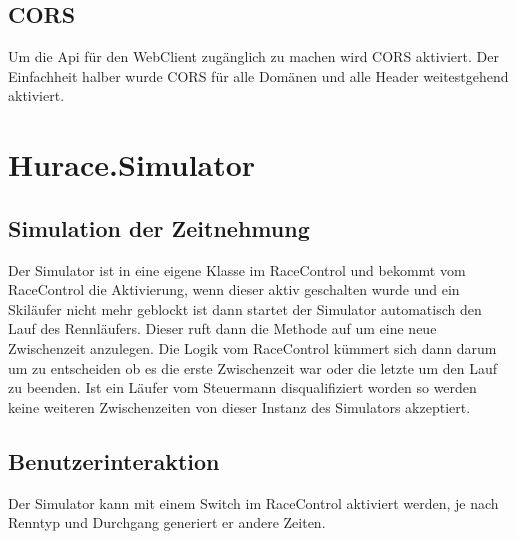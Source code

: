 \documentclass[a4paper, 12pt]{article}
\begin{document}
	\subsection{CORS}
	Um die Api für den WebClient zugänglich zu machen wird CORS aktiviert. Der Einfachheit halber wurde CORS für alle Domänen und alle Header weitestgehend aktiviert.
	
	
	\section{Hurace.Simulator}

	\subsection{Simulation der Zeitnehmung}
	Der Simulator ist in eine eigene Klasse im RaceControl und bekommt vom RaceControl die Aktivierung, wenn dieser aktiv geschalten wurde und ein Skiläufer nicht mehr geblockt ist dann startet der Simulator automatisch den Lauf des Rennläufers. Dieser ruft dann die Methode auf um eine neue Zwischenzeit anzulegen. 
	Die Logik vom RaceControl kümmert sich dann darum um zu entscheiden ob es die erste Zwischenzeit war oder die letzte um den Lauf zu beenden. Ist ein Läufer vom Steuermann disqualifiziert worden so werden keine weiteren Zwischenzeiten von dieser Instanz des Simulators akzeptiert.
	
	\subsection{Benutzerinteraktion}
	Der Simulator kann mit einem Switch im RaceControl aktiviert werden, je nach Renntyp und Durchgang generiert er andere Zeiten.
	
	
	\listoftodos
\end{document}
